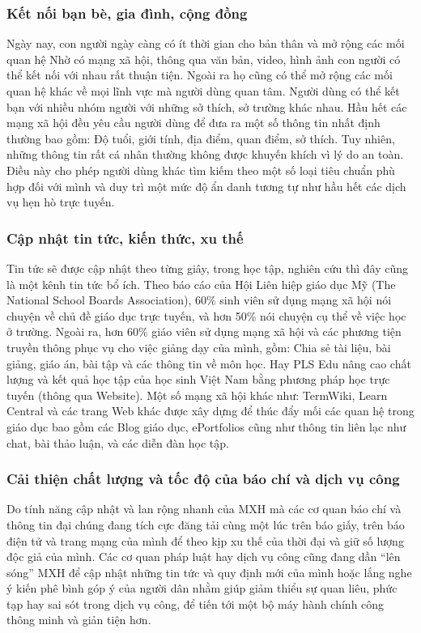 		\subsubsection{Kết nối bạn bè, gia đình, cộng đồng}
		Ngày nay, con người ngày càng có ít thời gian cho bản thân và mở rộng các mối quan hệ Nhờ có mạng xã hội, thông qua văn bản, video, hình ảnh con người có thể kết nối với nhau rất thuận tiện. Ngoài ra họ cũng có thể mở rộng các mối quan hệ khác về mọi lĩnh vực mà người dùng quan tâm. Người dùng có thể kết bạn với nhiều nhóm người với những sở thích, sở trường khác nhau. Hầu hết các mạng xã hội đều yêu cầu người dùng để đưa ra một số thông tin nhất định thường bao gồm: Độ tuổi, giới tính, địa điểm, quan điểm, sở thích. Tuy nhiên, những thông tin rất cá nhân thường không được khuyến khích vì lý do an toàn. Điều này cho phép người dùng khác tìm kiếm theo một số loại tiêu chuẩn phù hợp đối với mình và duy trì một mức độ ẩn danh tương tự như hầu hết các dịch vụ hẹn hò trực tuyến.
		\subsubsection{Cập nhật tin tức, kiến thức, xu thế}
		Tin tức sẽ được cập nhật theo từng giây, trong học tập, nghiên cứu thì đây cũng là một kênh tin tức bổ ích. Theo báo cáo của Hội Liên hiệp giáo dục Mỹ (The National School Boards Association), 60\% sinh viên sử dụng mạng xã hội nói chuyện về chủ đề giáo dục trực tuyến, và hơn 50\% nói chuyện cụ thể về việc học ở trường. Ngoài ra, hơn 60\% giáo viên sử dụng mạng xã hội và các phương tiện truyền thông phục vụ cho việc giảng dạy của mình, gồm: Chia sẻ tài liệu, bài giảng, giáo án, bài tập và các thông tin về môn học. Hay PLS Edu nâng cao chất lượng và kết quả học tập của học sinh Việt Nam bằng phương pháp học trực tuyến (thông qua Website). Một số mạng xã hội khác như: TermWiki, Learn Central và các trang Web khác được xây dựng để thúc đẩy mối các quan hệ trong giáo dục bao gồm các Blog giáo dục, ePortfolios cũng như thông tin liên lạc như chat, bài thảo luận, và các diễn đàn học tập.
		\subsubsection{Cải thiện chất lượng và tốc độ của báo chí và dịch vụ công}
		Do tính năng cập nhật và lan rộng nhanh của MXH mà các cơ quan báo chí và thông tin đại chúng đang tích cực đăng tải cùng một lúc trên báo giấy, trên báo điện tử và trang mạng của mình để theo kịp xu thế của thời đại và giữ số lượng độc giả của mình. Các cơ quan pháp luật hay dịch vụ công cũng đang dần “lên sóng” MXH để cập nhật những tin tức và quy định mới của mình hoặc lắng nghe ý kiến phê bình góp ý của người dân nhằm giúp giảm thiểu sự quan liêu, phức tạp hay sai sót trong dịch vụ công, để tiến tới một bộ máy hành chính công thông minh và giản tiện hơn.
